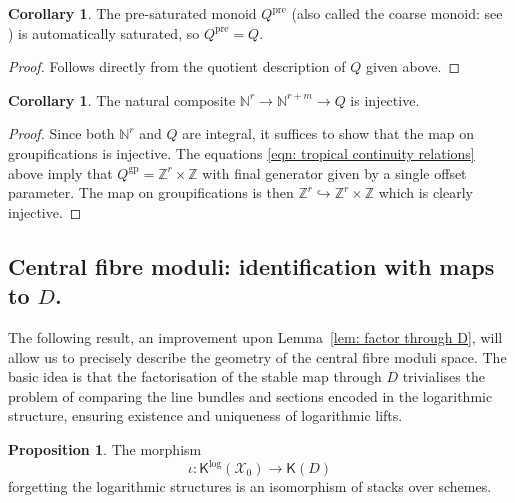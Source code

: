 \documentclass[11pt]{amsart}
\theoremstyle{definition}
\theoremstyle{definition}
\newtheorem{corollary}[theorem]{Corollary}
\newtheorem{proposition}[theorem]{Proposition}
\newcommand{\N}{\mathbb{N}}
\newcommand{\Z}{\mathbb{Z}}
\newcommand{\Xcal}{\mathcal{X}}
\newcommand{\Kup}{\mathsf{K}}
\begin{document}
\begin{corollary}\label{cor: pre-saturated monoid} The pre-saturated monoid $Q^{\mathrm{pre}}$ (also called the coarse monoid: see \cite[\S 3.7]{ChenLog}) is automatically saturated, so $Q^{\mathrm{pre}}=Q$.
	\end{corollary}
\begin{proof} Follows directly from the quotient description of $Q$ given above.\end{proof}

	
\begin{corollary} \label{cor: map Nr to Q injective} The natural composite $\N^r \to \N^{r+m} \to Q$ is injective.	
\end{corollary}
\begin{proof}Since both $\N^r$ and $Q$ are integral, it suffices to show that the map on groupifications is injective. The equations \eqref{eqn: tropical continuity relations} above imply that $Q^{\operatorname{gp}} = \Z^r \times \Z$ with final generator	given by a single offset parameter. The map on groupifications is then	 $\Z^r \hookrightarrow \Z^r \times \Z$ which is clearly injective.
\end{proof}



\subsection{Central fibre moduli: identification with maps to $D$.} The following result, an improvement upon Lemma~\ref{lem: factor through D}, will allow us to precisely describe the geometry of the central fibre moduli space. The basic idea is that the factorisation of the stable map through $D$ trivialises the problem of comparing the line bundles and sections encoded in the logarithmic structure, ensuring existence and uniqueness of logarithmic lifts.
\begin{proposition} \label{prop: identification of moduli spaces} The morphism
\begin{equation*} \iota \colon \Kup^{\log}(\Xcal_0) \to \Kup(D) \end{equation*}
forgetting the logarithmic structures is an isomorphism of stacks over schemes. \end{proposition}
\end{document}

